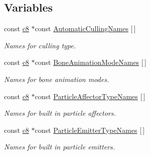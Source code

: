 \subsection*{Variables}
\begin{DoxyCompactItemize}
\item 
\mbox{\label{namespaceirr_1_1scene_afb3e3fc1668bd602189bab446801aa12}} 
const \hyperlink{namespaceirr_a9395eaea339bcb546b319e9c96bf7410}{c8} $\ast$const \hyperlink{namespaceirr_1_1scene_afb3e3fc1668bd602189bab446801aa12}{Automatic\+Culling\+Names} \mbox{[}$\,$\mbox{]}
\begin{DoxyCompactList}\small\item\em Names for culling type. \end{DoxyCompactList}\item 
\mbox{\label{namespaceirr_1_1scene_a578945909729ca194b0d44852aab8021}} 
const \hyperlink{namespaceirr_a9395eaea339bcb546b319e9c96bf7410}{c8} $\ast$const \hyperlink{namespaceirr_1_1scene_a578945909729ca194b0d44852aab8021}{Bone\+Animation\+Mode\+Names} \mbox{[}$\,$\mbox{]}
\begin{DoxyCompactList}\small\item\em Names for bone animation modes. \end{DoxyCompactList}\item 
\mbox{\label{namespaceirr_1_1scene_a1ce0e47158d68b401d23d833bc70bb86}} 
const \hyperlink{namespaceirr_a9395eaea339bcb546b319e9c96bf7410}{c8} $\ast$const \hyperlink{namespaceirr_1_1scene_a1ce0e47158d68b401d23d833bc70bb86}{Particle\+Affector\+Type\+Names} \mbox{[}$\,$\mbox{]}
\begin{DoxyCompactList}\small\item\em Names for built in particle affectors. \end{DoxyCompactList}\item 
\mbox{\label{namespaceirr_1_1scene_adf760b7abdec907704ec6190dfc0caba}} 
const \hyperlink{namespaceirr_a9395eaea339bcb546b319e9c96bf7410}{c8} $\ast$const \hyperlink{namespaceirr_1_1scene_adf760b7abdec907704ec6190dfc0caba}{Particle\+Emitter\+Type\+Names} \mbox{[}$\,$\mbox{]}
\begin{DoxyCompactList}\small\item\em Names for built in particle emitters. \end{DoxyCompactList}\item 

\end{DoxyCompactItemize}
